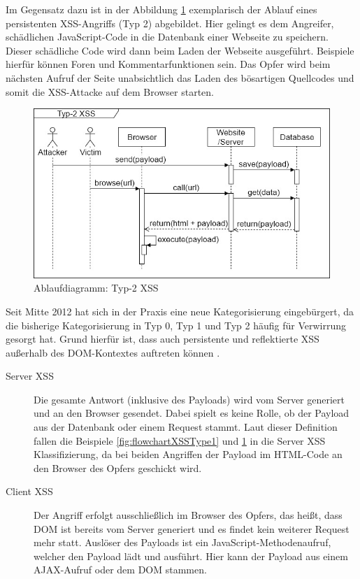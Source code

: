 		Im Gegensatz dazu ist in der Abbildung \ref{fig:flowchartXSSType2} exemplarisch der Ablauf eines persistenten \ac{XSS}-Angriffs (Typ 2) abgebildet. Hier gelingt es dem Angreifer, schädlichen JavaScript-Code in die Datenbank einer Webseite zu speichern. Dieser schädliche Code wird dann beim Laden der Webseite ausgeführt. Beispiele hierfür können Foren und Kommentarfunktionen sein. Das Opfer wird beim nächsten Aufruf der Seite unabsichtlich das Laden des bösartigen Quellcodes und somit die \ac{XSS}-Attacke auf dem Browser starten.
		
		\begin{figure}[htbp] 
			\centering
			\includegraphics[width=\textwidth]{contents/images/FlowchartXSSType2}
			\caption{Ablaufdiagramm: Typ-2 XSS}
			\label{fig:flowchartXSSType2}
		\end{figure}
		
\FloatBarrier
			Seit Mitte 2012 hat sich in der Praxis eine neue Kategorisierung eingebürgert, da die bisherige Kategorisierung in Typ 0, Typ 1 und Typ 2 häufig für Verwirrung gesorgt hat. Grund hierfür ist, dass auch persistente und reflektierte \ac{XSS} außerhalb des \ac{DOM}-Kontextes auftreten können \cite{Wichers2017}.
		
		
		\begin{description}
			\item [Server \ac{XSS}] Die gesamte Antwort (inklusive des Payloads) wird vom Server generiert und an den Browser gesendet. Dabei spielt es keine Rolle, ob der Payload aus der Datenbank oder einem Request stammt. Laut dieser Definition fallen die Beispiele \ref{fig:flowchartXSSType1} und \ref{fig:flowchartXSSType2} in die Server \ac{XSS} Klassifizierung, da bei beiden Angriffen der Payload im \ac{HTML}-Code an den Browser des Opfers geschickt wird.
			
			\item [Client \ac{XSS}] Der Angriff erfolgt ausschließlich im Browser des Opfers, das heißt, dass DOM ist bereits vom Server generiert und es findet kein weiterer Request mehr statt. 
			Auslöser des Payloads ist ein JavaScript-Methodenaufruf, welcher den Payload lädt und ausführt. Hier kann der Payload aus einem \gls{AJAX}-Aufruf oder dem \ac{DOM} stammen. 
		\end{description}

